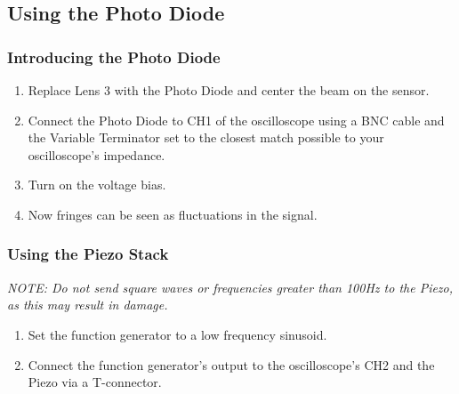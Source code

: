 \subsection{Using the Photo Diode}
\label{sec:photodiode}

    \subsubsection{Introducing the Photo Diode}
        \begin{enumerate}
        \item Replace Lens 3 with the Photo Diode and center the beam on the
        sensor.
        \item Connect the Photo Diode to CH1 of the oscilloscope using a BNC
        cable and the Variable Terminator set to the closest match possible to
        your oscilloscope's impedance.
        \item Turn on the voltage bias.
        \item Now fringes can be seen as fluctuations in the signal.
        \end{enumerate}
    \subsubsection{Using the Piezo Stack}
        
        \emph{NOTE: Do not send square waves or frequencies greater than 100Hz
        to the Piezo, as this may result in damage.}
        \begin{enumerate}
        \item Set the function generator to a low frequency sinusoid.
        \item Connect the function generator's output to the oscilloscope's CH2
        and the Piezo via a T-connector.
        \end{enumerate}

